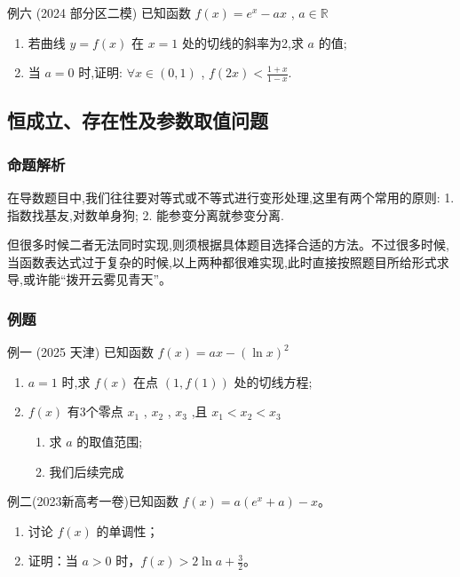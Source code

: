 \documentclass{article}
\begin{document}
例六 (2024 部分区二模) 已知函数 $f(x)=e^x-a x$ , $a \in \mathbb{R}$
\begin{enumerate}
\item[(I)] 若曲线 $y=f(x)$ 在 $x=1$ 处的切线的斜率为2,求 $a$ 的值;
\item[(II)] 当 $a=0$ 时,证明: $\forall x \in(0,1)$ , $f(2 x)<\frac{1+x}{1-x}$.
\end{enumerate}
\vspace{20\baselineskip}

\newpage
\subsection{恒成立、存在性及参数取值问题}
\subsubsection{命题解析}
在导数题目中,我们往往要对等式或不等式进行变形处理,这里有两个常用的原则:
1. 指数找基友,对数单身狗;
2. 能参变分离就参变分离.

但很多时候二者无法同时实现,则须根据具体题目选择合适的方法。不过很多时候,当函数表达式过于复杂的时候,以上两种都很难实现,此时直接按照题目所给形式求导,或许能“拨开云雾见青天”。

\subsubsection{例题}

例一 (2025 天津) 已知函数 $f(x)=a x-(\ln x)^2$
\begin{enumerate}
\item[(I)] $a=1$ 时,求 $f(x)$ 在点 $(1, f(1))$ 处的切线方程;
\item[(II)] $f(x)$ 有3个零点 $x_1$ , $x_2$ , $x_3$ ,且 $x_1<x_2<x_3$
\begin{enumerate}
\item[(i)] 求 $a$ 的取值范围;
\item[(ii)] 我们后续完成
\end{enumerate}
\end{enumerate}
\vspace{20\baselineskip}

例二(2023新高考一卷)已知函数 \(f(x) = a(e^x + a) - x\)。

\begin{enumerate}
    \item 讨论 \(f(x)\) 的单调性；
    \item 证明：当 \(a > 0\) 时，\(f(x) > 2\ln a + \frac{3}{2}\)。
\end{enumerate}
\vspace{20\baselineskip}
\end{document}
